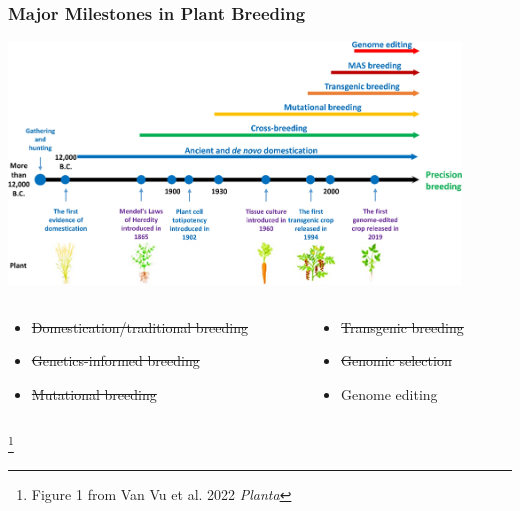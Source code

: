 \documentclass[xcolor=dvipsnames]{beamer}
\newcommand\blfootnote[1]{%
	\begingroup
	\renewcommand\thefootnote{}\footnote{#1}%
	\addtocounter{footnote}{-1}%
	\endgroup
}
\begin{document}
\begin{frame}
	\frametitle{Major Milestones in Plant Breeding}
	\centering	\includegraphics[keepaspectratio, width  = 0.9\textwidth]{img/timeLine}
	
	
	\begin{columns}
		\begin{column}{0.5\textwidth}
			\begin{itemize}
				\item[\textbf{1}] \st{Domestication/traditional breeding}
				\item[\textbf{2}] \st{Genetics-informed breeding}
				\item[\textbf{3}] \st{Mutational breeding}
			\end{itemize}
		\end{column}
		\begin{column}{0.5\textwidth}
			\begin{itemize}
				\item[\textbf{4}] \st{Transgenic breeding}
				\item[\textbf{5}] \st{Genomic selection} 
				\item[\textbf{6}] Genome editing
			\end{itemize}
		\end{column}
	\end{columns}
	
	\blfootnote{Figure 1 from Van Vu et al. 2022 \textit{Planta}}
	
	
	
\end{frame}
\end{document}
